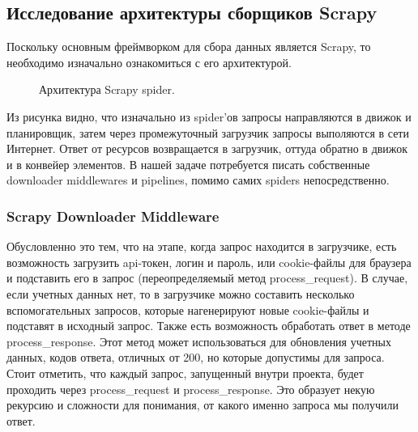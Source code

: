 \subsection{Исследование архитектуры сборщиков Scrapy}

Поскольку основным фреймворком для сбора данных является Scrapy, то необходимо изначально ознакомиться с его архитектурой.
\cite{scrapyArchitecture}

\begin{figure}[H]
    \caption{Архитектура Scrapy spider.}
    \label{ris:image}
\end{figure}

\par
Из рисунка видно, что изначально из spider'ов запросы направляются в движок и планировщик, затем через промежуточный загрузчик
запросы выполяются в сети Интернет. Ответ от ресурсов возвращается в загрузчик, оттуда обратно в движок и в конвейер элементов.
В нашей задаче потребуется писать собственные downloader middlewares и pipelines, помимо самих spiders непосредственно.

\subsubsection{Scrapy Downloader Middleware} 
Обусловленно это тем, что на этапе, когда запрос находится в загрузчике, есть возможность загрузить api-токен, логин и пароль,
или cookie-файлы для браузера и подставить его в запрос (переопределяемый метод process\_request). 
В случае, если учетных данных нет, то в загрузчике можно составить несколько вспомогательных запросов, которые нагенерируют 
новые cookie-файлы и подставят в исходный запрос. Также есть возможность обработать ответ в методе process\_response. 
Этот метод может использоваться для обновления учетных данных, кодов ответа, отличных от 200, но которые допустимы для запроса.
Стоит отметить, что каждый запрос, запущенный внутри проекта, будет проходить через process\_request и process\_response. Это
образует некую рекурсию и сложности для понимания, от какого именно запроса мы получили ответ.  

